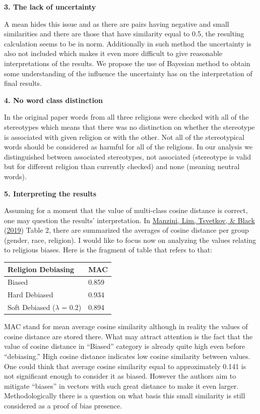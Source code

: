 \documentclass[
  12pt,
]{book}
\begin{document}
\textbf{3. The lack of uncertainty}

A mean hides this issue and as there are pairs having negative and small similarities and there are those that have similarity equal to 0.5, the resulting calculation seems to be in norm. Additionally in such method the uncertainty is also not included which makes it even more difficult to give reasonable interpretations of the results. We propose the use of Bayesian method to obtain some understanding of the influence the uncertainty has on the interpretation of final results.

\textbf{4. No word class distinction}

In the original paper words from all three religions were checked with all of the stereotypes which means that there was no distinction on whether the stereotype is associated with given religion or with the other. Not all of the stereotypical words should be considered as harmful for all of the religions. In our analysis we distinguished between associated stereotypes, not associated (stereotype is valid but for different religion than currently checked) and none (meaning neutral words).

\textbf{5. Interpreting the results}

Assuming for a moment that the value of multi-class cosine distance is correct, one may question the results' interpretation. In \protect\hyperlink{ref-manzini2019black}{Manzini, Lim, Tsvetkov, \& Black} (\protect\hyperlink{ref-manzini2019black}{2019}) Table 2, there are summarized the averages of cosine distance per group (gender, race, religion). I would like to focus now on analyzing the values relating to religious biases. Here is the fragment of table that refers to that:

\begin{longtable}[]{@{}ll@{}}
\toprule
Religion Debiasing & MAC \\
\midrule
\endhead
Biased & 0.859 \\
Hard Debiased & 0.934 \\
Soft Debiased (\(\lambda\) = 0.2) & 0.894 \\
\bottomrule
\end{longtable}

MAC stand for mean average cosine similarity although in reality the values of cosine distance are stored there. What may attract attention is the fact that the value of cosine distance in ``Biased'' category is already quite high even before ``debiasing.'' High cosine distance indicates low cosine similarity between values. One could think that average cosine similarity equal to approximately 0.141 is not significant enough to consider it as biased. However the authors aim to mitigate ``biases'' in vectors with such great distance to make it even larger. Methodologically there is a question on what basis this small similarity is still considered as a proof of bias presence.
\end{document}

